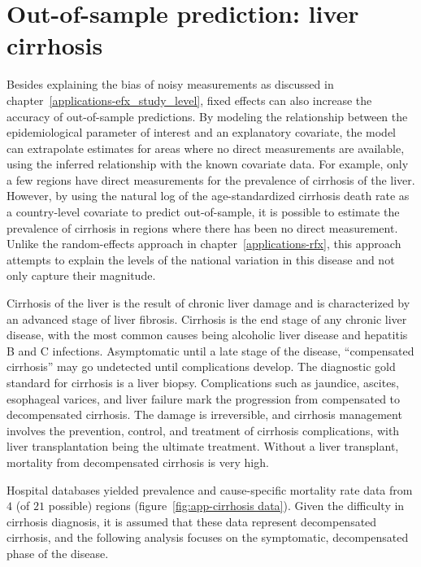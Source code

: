 \chapter{Out-of-sample prediction: liver cirrhosis}
\label{applications-efx_country_level}

Besides explaining the bias of noisy measurements as discussed in
chapter~\ref{applications-efx_study_level}, fixed effects can also
increase the accuracy of out-of-sample predictions.  By modeling the
relationship between the epidemiological parameter of interest and an
explanatory covariate, the model can extrapolate estimates for areas
where no direct measurements are available, using the inferred
relationship with the known covariate data.  For example, only a few
regions have direct measurements for the prevalence of cirrhosis of
the liver.  However, by using the natural log of the age-standardized
cirrhosis death rate as a country-level covariate to predict
out-of-sample, it is possible to estimate the prevalence of cirrhosis
in regions where there has been no direct measurement.  Unlike the
random-effects approach in chapter~\ref{applications-rfx}, this
approach attempts to explain the levels of the national variation in
this disease and not only capture their magnitude.

Cirrhosis of the liver is the result of chronic liver damage and is
characterized by an advanced stage of liver fibrosis.  Cirrhosis is
the end stage of any chronic liver disease, with the most common
causes being alcoholic liver disease and hepatitis B and C infections.
Asymptomatic until a late stage of the disease, ``compensated
cirrhosis'' may go undetected until complications develop.  The
diagnostic gold standard for cirrhosis is a liver biopsy.
Complications such as jaundice, ascites, esophageal varices,
and liver failure mark the progression
from compensated to decompensated cirrhosis.  The damage is irreversible, and cirrhosis
management involves the prevention, control, and treatment of cirrhosis
complications, with liver transplantation being the ultimate
treatment.  Without a liver transplant, mortality from decompensated
cirrhosis is very high. \cite{garcia-tsao_management_2009,
  damico_natural_2006, schuppan_liver_2008}

Hospital databases yielded prevalence and cause-specific mortality rate
data from $4$ (of $21$ possible) regions (figure~\ref{fig:app-cirrhosis data}).
Given the difficulty in
cirrhosis diagnosis, it is assumed that these data represent decompensated
cirrhosis, and the following analysis focuses on the symptomatic,
decompensated phase of the disease.

